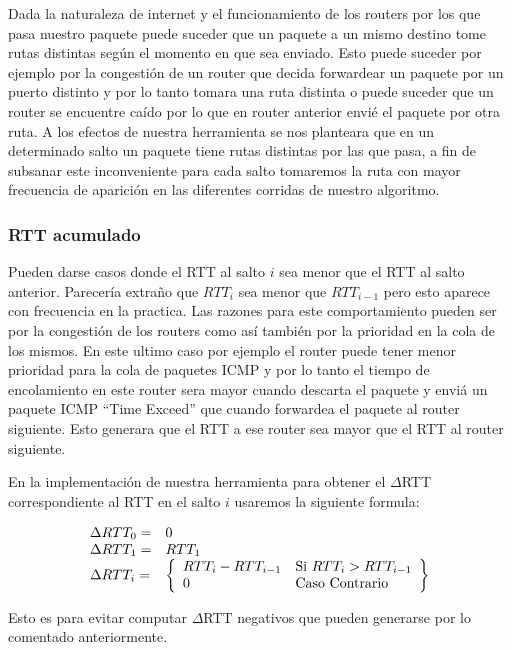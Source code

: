Dada la naturaleza de internet y el funcionamiento de los routers por los que pasa nuestro paquete puede suceder que un paquete a un mismo destino tome rutas distintas según el momento en que sea enviado. Esto puede suceder por ejemplo por la congestión de un router que decida forwardear un paquete por un puerto distinto y por lo tanto tomara una ruta distinta o puede suceder que un router se encuentre caído por lo que en router anterior envié el paquete por otra ruta.
A los efectos de nuestra herramienta se nos planteara que en un determinado salto un paquete tiene rutas distintas por las que pasa, a fin de subsanar este inconveniente para cada salto tomaremos la ruta con mayor frecuencia de aparición en las diferentes corridas de nuestro algoritmo.

\subsubsection{RTT acumulado} 

Pueden darse casos donde el RTT al salto $i$ sea menor que el RTT al salto anterior.
Parecería extraño que $RTT_i$ sea menor que $RTT_{i-1}$ pero esto aparece con frecuencia en la practica. Las razones para este comportamiento pueden ser por la congestión de los routers como así también por la prioridad en la cola de los mismos. En este ultimo caso por ejemplo el router puede tener menor prioridad para la cola de paquetes ICMP y por lo tanto el tiempo de encolamiento en este router sera mayor cuando descarta el paquete y enviá un paquete ICMP ``Time Exceed'' que cuando forwardea el paquete al router siguiente. Esto generara que el RTT a ese router sea mayor que el RTT al router siguiente.

En la implementación de nuestra herramienta para obtener el $\Delta$RTT correspondiente al RTT en el salto $i$ usaremos la siguiente formula:

\[
\begin{array}{l l}
    \Delta RTT_0 = & 0\\
    \Delta RTT_1 = & RTT_1\\
    \Delta RTT_i = & \left\{ 
        \begin{array}{l l} 
            RTT_i - RTT_{i-1} & \text{Si $RTT_i > RTT_{i-1}$}\\
            0  & \text{Caso Contrario}
        \end{array}\right\}
\end{array}
\]

Esto es para evitar computar $\Delta$RTT negativos que pueden generarse por lo comentado anteriormente.

